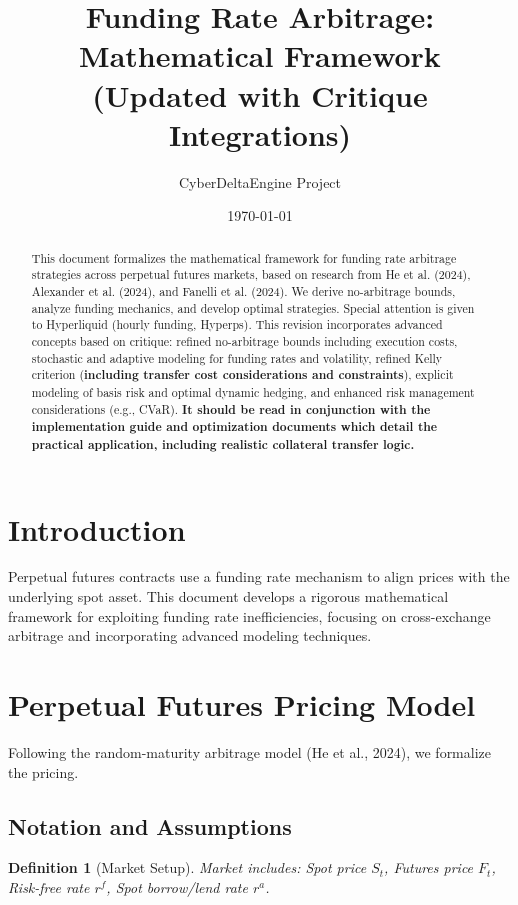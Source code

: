 \documentclass{article}
\title{Funding Rate Arbitrage: Mathematical Framework \\ \Large{(Updated with Critique Integrations)}}
\author{CyberDeltaEngine Project}
\date{\today}
\newtheorem{definition}{Definition}
\begin{document}
\maketitle

\begin{abstract}
This document formalizes the mathematical framework for funding rate arbitrage strategies across perpetual futures markets, based on research from He et al. (2024), Alexander et al. (2024), and Fanelli et al. (2024). We derive no-arbitrage bounds, analyze funding mechanics, and develop optimal strategies. Special attention is given to Hyperliquid (hourly funding, Hyperps). This revision incorporates advanced concepts based on critique: refined no-arbitrage bounds including execution costs, stochastic and adaptive modeling for funding rates and volatility, refined Kelly criterion (\textbf{including transfer cost considerations and constraints}), explicit modeling of basis risk and optimal dynamic hedging, and enhanced risk management considerations (e.g., CVaR). \textbf{It should be read in conjunction with the implementation guide and optimization documents which detail the practical application, including realistic collateral transfer logic.}
\end{abstract}

\section{Introduction}

Perpetual futures contracts use a funding rate mechanism to align prices with the underlying spot asset. This document develops a rigorous mathematical framework for exploiting funding rate inefficiencies, focusing on cross-exchange arbitrage and incorporating advanced modeling techniques.

\section{Perpetual Futures Pricing Model}

Following the random-maturity arbitrage model (He et al., 2024), we formalize the pricing.

\subsection{Notation and Assumptions}

\begin{definition}[Market Setup]
Market includes: Spot price $S_t$, Futures price $F_t$, Risk-free rate $r^f$, Spot borrow/lend rate $r^a$.
\end{definition}
\end{document}
